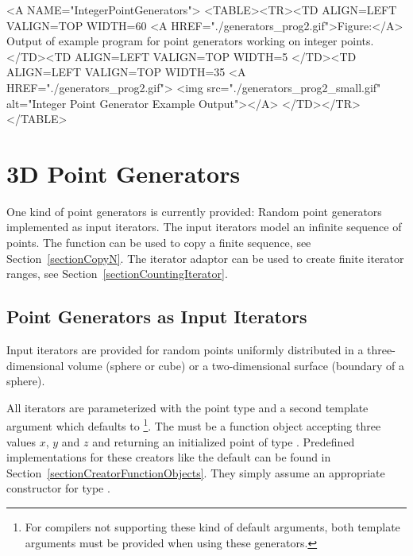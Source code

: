 
\begin{ccHtmlOnly}
  <A NAME="IntegerPointGenerators">
  <TABLE><TR><TD ALIGN=LEFT VALIGN=TOP WIDTH=60%
    <A HREF="./generators_prog2.gif">Figure:</A>
        Output of example program for point generators working
        on integer points.
  </TD><TD ALIGN=LEFT VALIGN=TOP WIDTH=5%
  </TD><TD ALIGN=LEFT VALIGN=TOP WIDTH=35%
    <A HREF="./generators_prog2.gif">
        <img src="./generators_prog2_small.gif" 
             alt="Integer Point Generator Example Output"></A>
  </TD></TR></TABLE>
\end{ccHtmlOnly}


\newpage
\section{3D Point Generators}

One kind of point generators is currently provided: Random point
generators implemented as input iterators.  The input iterators model
an infinite sequence of points. The function  can
be used to copy a finite sequence, see Section~\ref{sectionCopyN}. The
iterator adaptor  can be used to create
finite iterator ranges, see Section~\ref{sectionCountingIterator}.


\subsection{Point Generators as Input Iterators}

\ccDefinition

Input iterators are provided for random points uniformly distributed
in a three-dimensional volume (sphere or cube) or a two-dimensional
surface (boundary of a sphere).

All iterators are parameterized with the point type  and a second
template argument  which defaults to
\footnote{%
  For compilers not supporting these kind of default arguments, both
  template arguments must be provided when using these generators.}.
The  must be a function object accepting three
 values $x$, $y$ and $z$ and returning an initialized
point  of type . Predefined implementations for
these creators like the default can be found in
Section~\ref{sectionCreatorFunctionObjects}.  They simply assume an
appropriate constructor for type .

